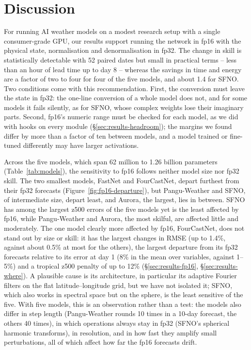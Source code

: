 \section{Discussion}
\label{sec:discussion}

For running AI weather models on a modest research setup with a single consumer-grade GPU, our results
support running the network in fp16 with the physical state,
normalisation and denormalisation in fp32. The change in skill is
statistically detectable with 52 paired dates but small in practical
terms -- less than an hour of lead time up to day 8 -- whereas the
savings in time and energy are a factor of two to four for four of
the five models, and about 1.4 for SFNO. Two conditions
come with this recommendation. First, the conversion must leave the
state in fp32: the one-line conversion of a whole model does not, and
for some models it fails silently, as for SFNO, whose complex weights
lose their imaginary parts. Second, fp16's numeric range
must be checked for each model, as we did with hooks on every module
(\S\ref{sec:results-headroom}); the margins we found differ by more than
a factor of ten between models, and a model trained or fine-tuned
differently may have larger activations.

Across the five models, which span 62 million to 1.26
billion parameters (Table~\ref{tab:models}), the sensitivity to fp16
follows neither model size nor fp32 skill. The two smallest models,
FastNet and FourCastNet, depart furthest from their fp32 forecasts
(Figure~\ref{fig:fp16-departure}), but Pangu-Weather and SFNO, of
intermediate size, depart least, and Aurora, the largest, lies in
between. SFNO has among the largest z500 errors of the five models yet is the
least affected by fp16, while Pangu-Weather and Aurora, the most skilful,
are affected little and moderately. The one model clearly more affected by fp16, FourCastNet, does not stand
out by size or skill: it has the largest changes in RMSE (up to 1.4\%,
against about 0.5\% at most for the others), the largest departure from
its fp32 forecasts relative to its error at day 1 (8\% in the mean over variables, against
1--5\%) and a tropical z500 penalty of up to 12\%
(\S\ref{sec:results-fp16}, \S\ref{sec:results-where}). A plausible cause is its
architecture, in particular its adaptive Fourier filters on the flat
latitude--longitude grid, but we have not isolated it; SFNO, which also
works in spectral space but on the sphere, is the least sensitive of the
five. With five models, this is an observation rather than a
test: the models also differ in step length (Pangu-Weather rounds 10
times in a 10-day forecast, the others 40 times), in which operations
always stay in fp32 (SFNO's spherical harmonic transforms), in
resolution, and in how fast they amplify small perturbations, all of
which affect how far the fp16 forecasts drift.

